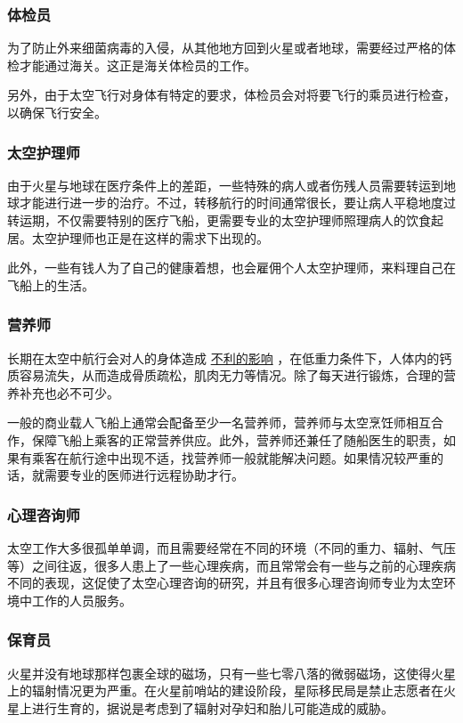 \documentclass[letterpaper,10pt]{sphinxmanual}
\begin{document}
\subsubsection{体检员}
\label{profession:id24}
为了防止外来细菌病毒的入侵，从其他地方回到火星或者地球，需要经过严格的体检才能通过海关。这正是海关体检员的工作。

另外，由于太空飞行对身体有特定的要求，体检员会对将要飞行的乘员进行检查，以确保飞行安全。


\subsubsection{太空护理师}
\label{profession:id25}
由于火星与地球在医疗条件上的差距，一些特殊的病人或者伤残人员需要转运到地球才能进行进一步的治疗。不过，转移航行的时间通常很长，要让病人平稳地度过转运期，不仅需要特别的医疗飞船，更需要专业的太空护理师照理病人的饮食起居。太空护理师也正是在这样的需求下出现的。

此外，一些有钱人为了自己的健康着想，也会雇佣个人太空护理师，来料理自己在飞船上的生活。


\subsubsection{营养师}
\label{profession:id26}
长期在太空中航行会对人的身体造成 \href{http://zh.wikipedia.org/zh-cn/\%E5\%A4\%AA\%E7\%A9\%BA\%E8\%88\%AA\%E8\%A1\%8C\%E5\%B0\%8D\%E4\%BA\%BA\%E9\%AB\%94\%E7\%9A\%84\%E5\%BD\%B1\%E9\%9F\%BF}{不利的影响} ，在低重力条件下，人体内的钙质容易流失，从而造成骨质疏松，肌肉无力等情况。除了每天进行锻炼，合理的营养补充也必不可少。

一般的商业载人飞船上通常会配备至少一名营养师，营养师与太空烹饪师相互合作，保障飞船上乘客的正常营养供应。此外，营养师还兼任了随船医生的职责，如果有乘客在航行途中出现不适，找营养师一般就能解决问题。如果情况较严重的话，就需要专业的医师进行远程协助才行。


\subsubsection{心理咨询师}
\label{profession:id28}
太空工作大多很孤单单调，而且需要经常在不同的环境（不同的重力、辐射、气压等）之间往返，很多人患上了一些心理疾病，而且常常会有一些与之前的心理疾病不同的表现，这促使了太空心理咨询的研究，并且有很多心理咨询师专业为太空环境中工作的人员服务。


\subsubsection{保育员}
\label{profession:id29}
火星并没有地球那样包裹全球的磁场，只有一些七零八落的微弱磁场，这使得火星上的辐射情况更为严重。在火星前哨站的建设阶段，星际移民局是禁止志愿者在火星上进行生育的，据说是考虑到了辐射对孕妇和胎儿可能造成的威胁。
\end{document}
